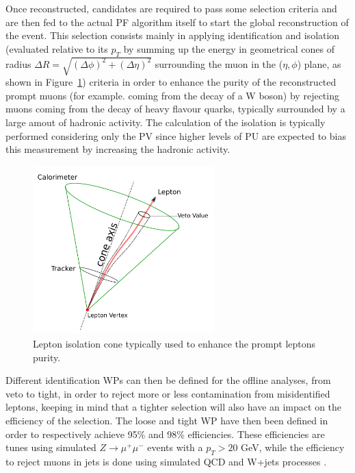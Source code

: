 \documentclass[a4paper, 10pt, openright]{report}
\begin{document}
Once reconstructed, candidates are required to pass some selection criteria and are then fed to the actual \ac{PF} algorithm itself to start the global reconstruction of the event. This selection consists mainly in applying identification and isolation (evaluated relative to its $p_T$ by summing up the energy in geometrical cones of radius $\Delta R = \sqrt{(\Delta \phi)^2 + (\Delta \eta)^2}$ surrounding the muon in the ($\eta, \phi$) plane, as shown in Figure~\ref{fig:IsoCone}) criteria in order to enhance the purity of the reconstructed prompt muons (for example. coming from the decay of a W boson) by rejecting muons coming from the decay of heavy flavour quarks, typically surrounded by a large amout of hadronic activity. The calculation of the isolation is typically performed considering only the \ac{PV} since higher levels of \ac{PU} are expected to bias this measurement by increasing the hadronic activity.

\begin{figure}[htbp]
\begin{center}
\includegraphics[width=7cm, height=6.5cm]{figs/IsoCone.png}
\caption{Lepton isolation cone typically used to enhance the prompt leptons purity.}
\label{fig:IsoCone}
\end{center}
\end{figure}

Different identification \acfp{WP} can then be defined for the offline analyses, from veto to tight, in order to reject more or less contamination from misidentified leptons, keeping in mind that a tighter selection will also have an impact on the efficiency of the selection. The loose and tight \ac{WP} have then been defined in order to respectively achieve 95\% and 98\% efficiencies. These efficiencies are tunes using simulated $Z \rightarrow \mu^+ \mu^-$ events with a $p_T > 20$ GeV, while the efficiency to reject muons in jets is done using simulated QCD and W+jets processes \cite{MuonSystemsEff}.
\end{document}
